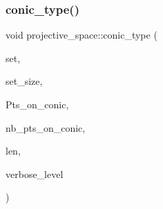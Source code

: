 \mbox{\label{classprojective__space_af5a8dcbc4bbe1638c3037b949b3b3306}} 
\subsubsection{\texorpdfstring{conic\+\_\+type()}{conic\_type()}}
{\footnotesize\ttfamily void projective\+\_\+space\+::conic\+\_\+type (\begin{DoxyParamCaption}\item[{\mbox{\hyperlink{galois_8h_a09fddde158a3a20bd2dcadb609de11dc}{I\+NT}} $\ast$}]{set,  }\item[{\mbox{\hyperlink{galois_8h_a09fddde158a3a20bd2dcadb609de11dc}{I\+NT}}}]{set\+\_\+size,  }\item[{\mbox{\hyperlink{galois_8h_a09fddde158a3a20bd2dcadb609de11dc}{I\+NT}} $\ast$$\ast$\&}]{Pts\+\_\+on\+\_\+conic,  }\item[{\mbox{\hyperlink{galois_8h_a09fddde158a3a20bd2dcadb609de11dc}{I\+NT}} $\ast$\&}]{nb\+\_\+pts\+\_\+on\+\_\+conic,  }\item[{\mbox{\hyperlink{galois_8h_a09fddde158a3a20bd2dcadb609de11dc}{I\+NT}} \&}]{len,  }\item[{\mbox{\hyperlink{galois_8h_a09fddde158a3a20bd2dcadb609de11dc}{I\+NT}}}]{verbose\+\_\+level }\end{DoxyParamCaption})}

\mbox{\label{classprojective__space_af486b51daa10b4de0c8b50fb5c1c2ee7}} 
